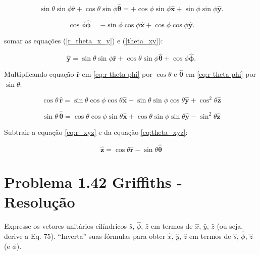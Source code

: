 \documentclass[a4paper,12pt]{article}
\begin{document}
\begin{equation}\label{r_theta_x_y}
\sin\theta \sin\phi \hat{\mathbf{r}} + \cos\theta \sin\phi \hat{\bm{\theta}} = +\cos\phi \sin\phi \hat{\mathbf{x}} + \sin\phi \sin\phi \hat{\mathbf{y}}.
\end{equation}
    
\begin{equation}\label{theta_xy}
\cos\phi\hat{\bm{\phi}} = -\sin\phi \cos\phi \hat{\mathbf{x}} + \cos\phi \cos\phi \hat{\mathbf{y}}.
\end{equation}

somar as equações (\ref{r_theta_x_y}) e (\ref{theta_xy}):

\begin{equation}
\hat{\mathbf{y}} = \sin\theta \sin\phi \hat{\mathbf{r}} + \cos\theta \sin\phi \hat{\bm{\theta}} + \cos\phi\hat{\bm{\phi}}.
\end{equation}

Multiplicando equação $\hat{\mathbf{r}}$ em  \ref{eq:r-theta-phi} por $\cos\theta$ e $\hat{\bm{\theta}}$ em \ref{eq:r-theta-phi} por $\sin\theta$:

\begin{equation}\label{eq:r_xyz}
\cos\theta \, \hat{\mathbf{r}} = \sin\theta \cos\phi \cos\theta \hat{\mathbf{x}} + \sin\theta \sin\phi \cos\theta \hat{\mathbf{y}} + \cos^{2}\theta \hat{\mathbf{z}}
\end{equation}

\begin{equation}\label{eq:theta_xyz}
\sin\theta \, \hat{\bm{\theta}} = \cos\theta \cos\phi \sin\theta \hat{\mathbf{x}} + \cos\theta \sin\phi \sin\theta \hat{\mathbf{y}} - \sin^{2}\theta  \hat{\mathbf{z}}
\end{equation}

Subtrair a equa\c{c}\~ao \ref{eq:r_xyz} e da equa\c{c}\~ao \ref{eq:theta_xyz}:

\begin{equation}
\hat{\mathbf{z}} = \cos\theta \hat{\mathbf{r}} - \sin\theta \hat{\bm{\theta}}
\end{equation}


\section*{Problema 1.42 Griffiths - Resolu\c{c}\~ao}

Expresse os vetores unitários cilíndricos $\hat{s}$, $\hat{\phi}$, $\hat{z}$ em termos 
de $\hat{x}$, $\hat{y}$, $\hat{z}$ (ou seja, derive a Eq. 75). ``Inverta'' suas fórmulas 
para obter $\hat{x}$, $\hat{y}$, $\hat{z}$ em termos de $\hat{s}$, $\hat{\phi}$, $\hat{z}$ (e $\phi$).
\end{document}
